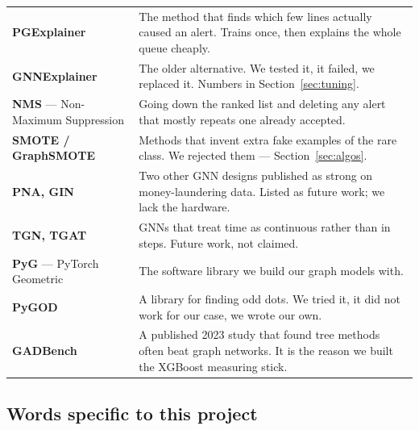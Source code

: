 \documentclass[11pt,a4paper]{article}
\begin{document}
\begin{longtable}{@{}p{4.1cm}p{11.4cm}@{}}
\textbf{PGExplainer} & The method that finds which few lines actually caused an
alert. Trains once, then explains the whole queue cheaply. \\
\textbf{GNNExplainer} & The older alternative. We tested it, it failed, we
replaced it. Numbers in Section~\ref{sec:tuning}. \\
\textbf{NMS} --- Non-Maximum Suppression & Going down the ranked list and deleting
any alert that mostly repeats one already accepted. \\
\textbf{SMOTE / GraphSMOTE} & Methods that invent extra fake examples of the rare
class. We rejected them --- Section~\ref{sec:algos}. \\
\textbf{PNA, GIN} & Two other GNN designs published as strong on money-laundering
data. Listed as future work; we lack the hardware. \\
\textbf{TGN, TGAT} & GNNs that treat time as continuous rather than in steps.
Future work, not claimed. \\
\textbf{PyG} --- PyTorch Geometric & The software library we build our graph
models with. \\
\textbf{PyGOD} & A library for finding odd dots. We tried it, it did not work for
our case, we wrote our own. \\
\textbf{GADBench} & A published 2023 study that found tree methods often beat
graph networks. It is the reason we built the XGBoost measuring stick. \\
\bottomrule
\end{longtable}

\subsection{Words specific to this project}
\end{document}
